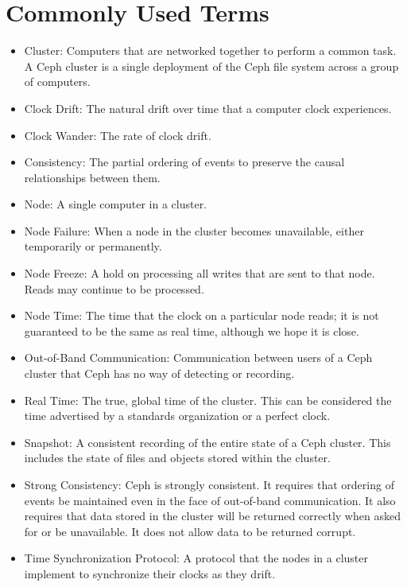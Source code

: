 \chapter{Commonly Used Terms}
\label{sec:terms}

\begin{itemize}

\item Cluster: Computers that are networked together to perform a
  common task. A Ceph cluster is a single deployment of the Ceph file
  system across a group of computers.
    
\item Clock Drift: The natural drift over time that a computer clock
  experiences.
    
\item Clock Wander: The rate of clock drift.

\item Consistency: The partial ordering of events to preserve the
  causal relationships between them.
    
\item Node: A single computer in a cluster.
  
\item Node Failure: When a node in the cluster becomes unavailable,
  either temporarily or permanently.
      
\item Node Freeze: A hold on processing all writes that are sent to
  that node. Reads may continue to be processed.
    
\item Node Time: The time that the clock on a particular node reads;
  it is not guaranteed to be the same as real time, although we hope
  it is close.
    
\item Out-of-Band Communication: Communication between users of a Ceph
  cluster that Ceph has no way of detecting or recording.
    
\item Real Time: The true, global time of the cluster. This can be
  considered the time advertised by a standards organization or a
  perfect clock.

\item Snapshot: A consistent recording of the entire state of a Ceph
  cluster.  This includes the state of files and objects stored within
  the cluster.
    
\item Strong Consistency: Ceph is strongly consistent. It requires
  that ordering of events be maintained even in the face of
  out-of-band communication. It also requires that data stored in the
  cluster will be returned correctly when asked for or be
  unavailable. It does not allow data to be returned corrupt.

\item Time Synchronization Protocol: A protocol that the nodes in a
  cluster implement to synchronize their clocks as they drift.


  
\end{itemize}

